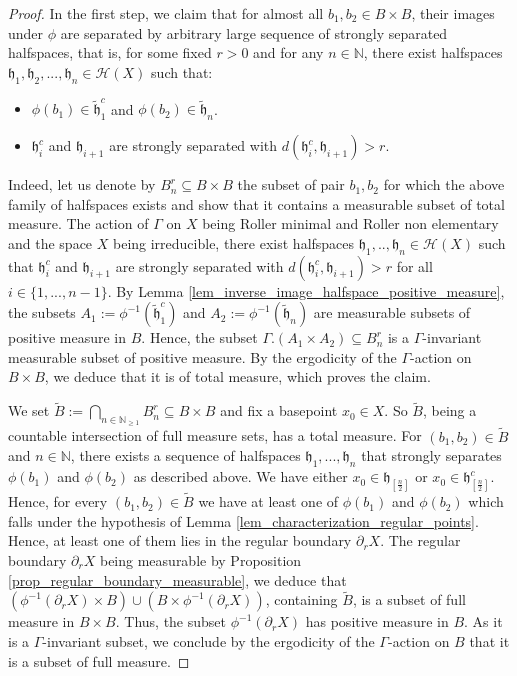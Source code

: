 \documentclass{amsart}
\numberwithin{equation}{section}
\newcommand{\HH}{\mathcal{H}}     %
\newcommand{\hh}{\mathfrak{h}}    %
\newcommand{\NN}{\mathbb{N}}      %
\theoremstyle{definition}
\begin{document}
\begin{proof}
In the first step, we claim that for almost all $b_1,b_2\in B\times B$, their images under $\phi$ are separated by arbitrary large sequence of strongly separated halfspaces, that is, for some fixed $r>0$ and for any $n\in \NN$, there exist halfspaces $\hh_1,\hh_2,...,\hh_n\in\HH(X)$ such that:
\begin{itemize}
    \item $\phi(b_1)\in\tilde{\hh}_1^c$ and $\phi(b_2)\in \tilde{\hh}_n$.
    \item $\hh_i^c$ and $\hh_{i+1}$ are strongly separated with $d(\hh_i^c,\hh_{i+1})>r$.
\end{itemize}
Indeed, let us denote by $B_n^r\subseteq B\times B$ the subset of pair $b_1,b_2$ for which the above family of halfspaces exists and show that it contains a measurable subset of total measure. The action of $\Gamma$ on $X$ being Roller minimal and Roller non elementary and the space $X$ being irreducible, there exist halfspaces $\hh_1,..,\hh_n\in \HH(X)$ such that $\hh_i^c$ and $\hh_{i+1}$ are strongly separated with $d(\hh_i^c,\hh_{i+1})>r$ for all $i\in\{1,...,n-1\}$. By Lemma \ref{lem_inverse_image_halfspace_positive_measure}, the subsets $A_1:=\phi^{-1}(\tilde{\hh}_1^c)$ and $A_2:=\phi^{-1}(\tilde{\hh}_n)$ are measurable subsets of positive measure in $B$. Hence, the subset $\Gamma.(A_1\times A_2)\subseteq B_n^r$ is a $\Gamma$-invariant measurable subset of positive measure. By the ergodicity of the $\Gamma$-action on $B\times B$, we deduce that it is of total measure, which proves the claim.\par 
We set $\tilde{B}:=\displaystyle{\bigcap_{n\in\NN_{\geq 1}}B_n^r}\subseteq B\times B$ and fix a basepoint $x_0\in X$. So $\tilde{B}$, being a countable intersection of full measure sets, has a total measure. For $(b_1,b_2)\in\tilde{B}$ and $n\in\NN$, there exists a sequence of halfspaces $\hh_1,...,\hh_n$ that strongly separates $\phi(b_1)$ and $\phi(b_2)$ as described above. We have either $x_0\in\hh_{[\frac{n}{2}]}$ or $x_0\in\hh_{[\frac{n}{2}]}^c$. Hence, for every $(b_1,b_2)\in \tilde{B}$ we have at least one of $\phi(b_1)$ and $\phi(b_2)$ which falls under the hypothesis of Lemma \ref{lem_characterization_regular_points}. Hence, at least one of them lies in the regular boundary $\partial_r X$. The regular boundary $\partial_r X$ being measurable by Proposition \ref{prop_regular_boundary_measurable}, we deduce that $(\phi^{-1}(\partial_r X)\times B)\cup(B\times \phi^{-1}(\partial_r X)) $, containing $\tilde{B}$, is a subset of full measure in $B\times B$. Thus, the subset $\phi^{-1}(\partial_r X)$ has positive measure in $B$. As it is a $\Gamma$-invariant subset, we conclude by the ergodicity of the $\Gamma$-action on $B$ that it is a subset of full measure.
\end{proof}
\end{document}
